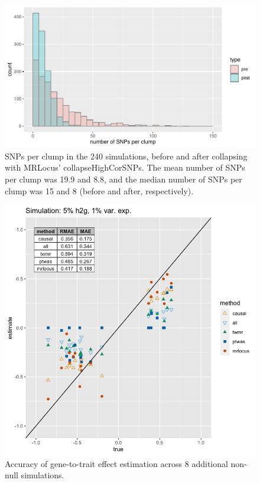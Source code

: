 \documentclass[11pt]{article}
\begin{document}
\begin{figure}[!ht]
  \centering
  \includegraphics[width=.7\textwidth]{figs/snps-per-clump}
  \caption{SNPs per clump in the 240 simulations, before and after
    collapsing with MRLocus’ collapseHighCorSNPs. The mean number of
    SNPs per clump was 19.9 and 8.8, and the median number of SNPs per
    clump was 15 and 8 (before and after, respectively).} 
\end{figure}

\begin{figure}[!ht]
  \centering
  \includegraphics[width=.7\textwidth]{figs/sim2.png}
  \caption{Accuracy of gene-to-trait effect estimation across 8
    additional non-null simulations.} 
\end{figure}
\end{document}
